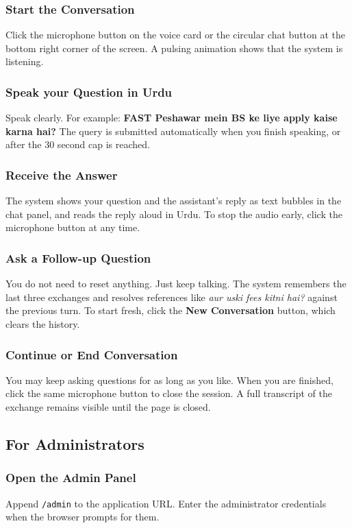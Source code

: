 \documentclass[12pt,a4paper]{report}
\begin{document}
\subsubsection{Start the Conversation}
Click the microphone button on the voice card or the circular chat
button at the bottom right corner of the screen. A pulsing animation
shows that the system is listening.

\subsubsection{Speak your Question in Urdu}
Speak clearly. For example: \textbf{FAST Peshawar mein BS ke liye apply
kaise karna hai?} The query is submitted automatically when you finish
speaking, or after the 30 second cap is reached.

\subsubsection{Receive the Answer}
The system shows your question and the assistant's reply as text bubbles
in the chat panel, and reads the reply aloud in Urdu. To stop the audio
early, click the microphone button at any time.

\subsubsection{Ask a Follow-up Question}
You do not need to reset anything. Just keep talking. The system
remembers the last three exchanges and resolves references like
\textit{aur uski fees kitni hai?} against the previous turn. To start
fresh, click the \textbf{New Conversation} button, which clears the
history.

\subsubsection{Continue or End Conversation}
You may keep asking questions for as long as you like. When you are
finished, click the same microphone button to close the session. A full
transcript of the exchange remains visible until the page is closed.

\subsection{For Administrators}

\subsubsection{Open the Admin Panel}
Append \texttt{/admin} to the application URL. Enter the administrator
credentials when the browser prompts for them.
\end{document}
